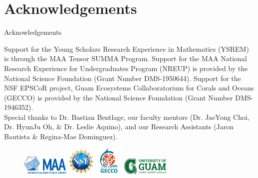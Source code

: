 \documentclass{beamer}
\begin{document}
\section*{Acknowledgements}
\begin{frame}{Acknowledgements}
    \begin{center}
        Support for the Young Scholars Research Experience in Mathematics (YSREM)  is through the MAA Tensor SUMMA Program. Support for the MAA National Research Experience for Undergraduates Program (NREUP) is provided by the National Science Foundation (Grant Number DMS-1950644). Support for the NSF EPSCoR project, Guam Ecosystems Collaboratorium for Corals and Oceans (GECCO) is provided by the National Science Foundation (Grant Number DMS-1946352). \\
    \vspace{.2cm}
    \small{Special thanks to Dr. Bastian Bentlage, our faculty mentors (Dr. JaeYong Choi, Dr. HyunJu Oh, \& Dr. Leslie Aquino), and our Research Assistants (Jaron Bautista \& Regina-Mae Dominguez).}
    
    \begin{figure}
        \includegraphics[width = 0.20\textwidth]{Figures/MAA_logo_PMS286.jpg}
        \label{MAA}
        \includegraphics[width = 0.12\textwidth]{Figures/NSF_4-Color_bitmap_Logo.png}
        \label{NSF}
        \includegraphics[width = 0.12\textwidth]{Figures/epscor.jpeg}
        \label{epscor}
        \includegraphics[width = 0.20\textwidth]{Figures/UOG-horizontal.png}
        \label{uog}
    \end{figure}
    \end{center}
\end{frame}
\end{document}
